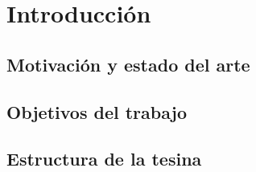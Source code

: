\chapter{Introducción}

\section{Motivación y estado del arte} 

\section{Objetivos del trabajo}

\section{Estructura de la tesina}
